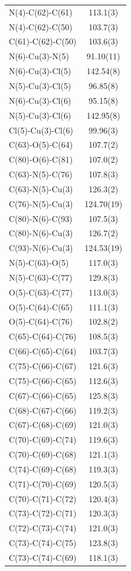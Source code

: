 \begin{center}
{\begin{supertabular}{p{1.5in}c}
N(4)-C(62)-C(61)&113.1(3)\\
N(4)-C(62)-C(50)&103.7(3)\\
C(61)-C(62)-C(50)&103.6(3)\\
N(6)-Cu(3)-N(5)&91.10(11)\\
N(6)-Cu(3)-Cl(5)&142.54(8)\\
N(5)-Cu(3)-Cl(5)&96.85(8)\\
N(6)-Cu(3)-Cl(6)&95.15(8)\\
N(5)-Cu(3)-Cl(6)&142.95(8)\\
Cl(5)-Cu(3)-Cl(6)&99.96(3)\\
C(63)-O(5)-C(64)&107.7(2)\\
C(80)-O(6)-C(81)&107.0(2)\\
C(63)-N(5)-C(76)&107.8(3)\\
C(63)-N(5)-Cu(3)&126.3(2)\\
C(76)-N(5)-Cu(3)&124.70(19)\\
C(80)-N(6)-C(93)&107.5(3)\\
C(80)-N(6)-Cu(3)&126.7(2)\\
C(93)-N(6)-Cu(3)&124.53(19)\\
N(5)-C(63)-O(5)&117.0(3)\\
N(5)-C(63)-C(77)&129.8(3)\\
O(5)-C(63)-C(77)&113.0(3)\\
O(5)-C(64)-C(65)&111.1(3)\\
O(5)-C(64)-C(76)&102.8(2)\\
C(65)-C(64)-C(76)&108.5(3)\\
C(66)-C(65)-C(64)&103.7(3)\\
C(75)-C(66)-C(67)&121.6(3)\\
C(75)-C(66)-C(65)&112.6(3)\\
C(67)-C(66)-C(65)&125.8(3)\\
C(68)-C(67)-C(66)&119.2(3)\\
C(67)-C(68)-C(69)&121.0(3)\\
C(70)-C(69)-C(74)&119.6(3)\\
C(70)-C(69)-C(68)&121.1(3)\\
C(74)-C(69)-C(68)&119.3(3)\\
C(71)-C(70)-C(69)&120.5(3)\\
C(70)-C(71)-C(72)&120.4(3)\\
C(73)-C(72)-C(71)&120.3(3)\\
C(72)-C(73)-C(74)&121.0(3)\\
C(73)-C(74)-C(75)&123.8(3)\\
C(73)-C(74)-C(69)&118.1(3)\\

\end{supertabular}}
\end{center}
